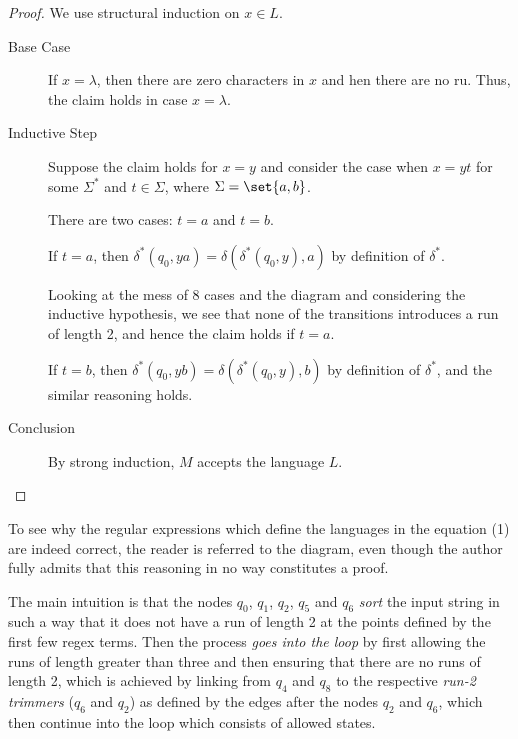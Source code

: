 \documentclass[11pt]{scrartcl}
\begin{document}
\begin{proof}
  \hfill

  We use structural induction on $x\in L$.

\begin{description}
\item[Base Case] \hfill

  If $x = \lambda$, then there are zero characters in $x$ and hen   there are no ru. Thus, the claim holds in case $x= \lambda$.
\item[Inductive Step] \hfill

  Suppose the claim holds for $x=y$ and consider the case when $x= yt$
  for some $\Sigma^{*}$ and $t\in \Sigma$, where
  $\Sigma = \set{ a, b}$.

  There are two cases: $t = a$ and $t=b$.

  If $t = a$, then $\delta^{*}(q_0, ya) = \delta(\delta^{*}(q_0, y), a)$ by definition of $\delta^{*}$.

  Looking at the mess of 8 cases and the diagram and considering the
  inductive hypothesis, we see that none of the transitions introduces
  a run of length 2, and hence the claim holds if $t = a$.

  If $t = b$, then
  $\delta^{*}(q_0, yb) = \delta(\delta^{*}(q_0, y), b)$ by definition
  of $\delta^{*}$, and the similar reasoning holds.

\item[Conclusion]
  \hfill

  By strong induction, $M$ accepts the language $L$.
\end{description}
\end{proof}

To see why the regular expressions which define the languages in the
equation (1) are indeed correct, the reader is referred to the
diagram, even though the author fully admits that this reasoning in no
way constitutes a proof.

The main intuition is that the nodes $q_0$, $q_1$, $q_2$, $q_5$ and
$q_6$ \textit{sort} the input string in such a way that it does not
have a run of length 2 at the points defined by the first few regex
terms. Then the process \textit{goes into the loop} by first allowing
the runs of length greater than three and then ensuring that there are
no runs of length 2, which is achieved by linking from $q_{4}$ and
$q_8$ to the respective \textit{run-2 trimmers} ($q_{6}$ and $q_{2}$)
as defined by the edges after the nodes $q_2$ and $q_6$, which then
continue into the loop which consists of allowed states.
\end{document}
